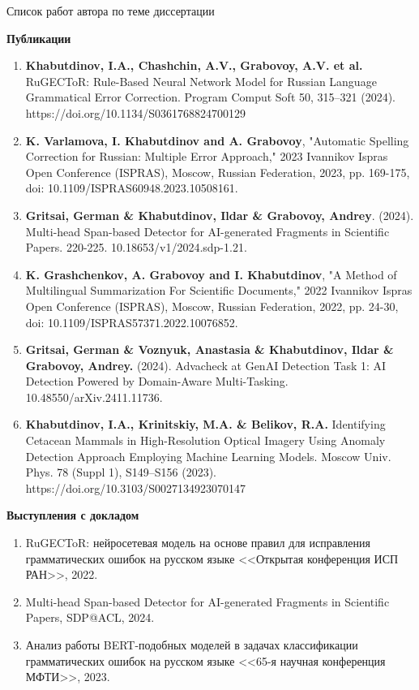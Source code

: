 \documentclass[10pt]{beamer}
\begin{document}
\begin{frame}{Список работ автора по теме диссертации}
\justifying
{
\scriptsize
\textbf{Публикации}

\begin{enumerate}
\item \textbf{Khabutdinov, I.A., Chashchin, A.V., Grabovoy, A.V. et al.} RuGECToR: Rule-Based Neural Network Model for Russian Language Grammatical Error Correction. Program Comput Soft 50, 315–321 (2024). https://doi.org/10.1134/S0361768824700129 
\item \textbf{K. Varlamova, I. Khabutdinov and A. Grabovoy}, "Automatic Spelling Correction for Russian: Multiple Error Approach," 2023 Ivannikov Ispras Open Conference (ISPRAS), Moscow, Russian Federation, 2023, pp. 169-175, doi: 10.1109/ISPRAS60948.2023.10508161.
\item \textbf{Gritsai, German \& Khabutdinov, Ildar \& Grabovoy, Andrey}. (2024). Multi-head Span-based Detector for AI-generated Fragments in Scientific Papers. 220-225. 10.18653/v1/2024.sdp-1.21. 
\item \textbf{K. Grashchenkov, A. Grabovoy and I. Khabutdinov}, "A Method of Multilingual Summarization For Scientific Documents," 2022 Ivannikov Ispras Open Conference (ISPRAS), Moscow, Russian Federation, 2022, pp. 24-30, doi: 10.1109/ISPRAS57371.2022.10076852.
\item \textbf{Gritsai, German \& Voznyuk, Anastasia \& Khabutdinov, Ildar \& Grabovoy, Andrey.} (2024). Advacheck at GenAI Detection Task 1: AI Detection Powered by Domain-Aware Multi-Tasking. 10.48550/arXiv.2411.11736. 
\item \textbf{Khabutdinov, I.A., Krinitskiy, M.A. & Belikov, R.A.} Identifying Cetacean Mammals in High-Resolution Optical Imagery Using Anomaly Detection Approach Employing Machine Learning Models. Moscow Univ. Phys. 78 (Suppl 1), S149–S156 (2023). https://doi.org/10.3103/S0027134923070147
      
\end{enumerate}

\textbf{Выступления с докладом}
\begin{enumerate}
\item RuGECToR: нейросетевая модель на основе правил для исправления грамматических ошибок на русском языке <<Открытая конференция ИСП РАН>>, 2022.
\item Multi-head Span-based Detector for AI-generated Fragments in Scientific Papers, SDP@ACL, 2024.
\item Анализ работы BERT-подобных моделей в задачах классификации грамматических ошибок на русском языке <<65-я научная конференция МФТИ>>, 2023.
\end{enumerate}
}
\end{frame}
\end{document}
